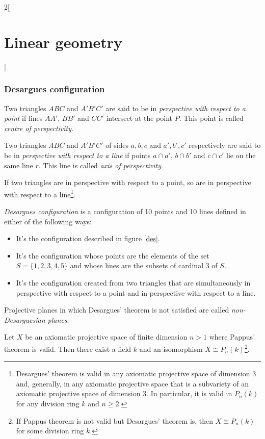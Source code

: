 \documentclass[../../../main.tex]{subfiles}
\begin{document}
\begin{multicols}{2}[\section{Linear geometry}]
\subsubsection*{Desargues configuration}
\begin{definition}
Two triangles $ABC$ and $A'B'C'$ are said to be in \textit{perspective with respect to a point} if lines $AA'$, $BB'$ and $CC'$ intersect at the point $P$. This point is called \textit{centre of perspectivity}.
\end{definition}
\begin{definition}
Two triangles $ABC$ and $A'B'C'$ of sides $a,b,c$ and $a',b',c'$ respectively are said to be in \textit{perspective with respect to a line} if points $a\cap a'$, $b\cap b'$ and $c\cap c'$ lie on the same line $r$. This line is called \textit{axis of perspectivity}.
\end{definition}
\begin{theorem}
If two triangles are in perspective with respect to a point, so are in perspective with respect to a line\footnote{Desargues' theorem is valid in any axiomatic projective space of dimension 3 and, generally, in any axiomatic projective space that is a subvariety of an axiomatic projective space of dimension 3. In particular, it is valid in $P_n(k)$ for any division ring $k$ and $n\geq2$.}.
\end{theorem}
\begin{definition}
\textit{Desargues configuration} is a configuration of 10 points and 10 lines defined in either of the following ways:
\begin{itemize}
    \item It's the configuration described in figure \ref{des}.
    \item It's the configuration whose points are the elements of the set $S=\{1,2,3,4,5\}$ and whose lines are the subsets of cardinal 3 of $S$.
    \item It's the configuration created from two triangles that are simultaneously in perspective with respect to a point and in perspective with respect to a line. 
\end{itemize}
\end{definition}
\begin{definition}
Projective planes in which Desargues' theorem is not satisfied are called \textit{non-Desarguesian planes}.
\end{definition}
\begin{theorem}
Let $X$ be an axiomatic projective space of finite dimension $n>1$ where Pappus' theorem is valid. Then there exist a field $k$ and an isomorphism $X\cong P_n(k)$\footnote{If Pappus theorem is not valid but Desargues' theorem is, then $X\cong P_n(k)$ for some division ring $k$.}.
\end{theorem}

\end{multicols}
\end{document}
